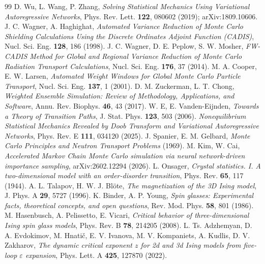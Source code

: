 \documentclass[11pt,a4paper]{article}
\begin{document}
\begin{thebibliography}{99}
 D. Wu, L. Wang, P. Zhang, \emph{Solving Statistical Mechanics Using Variational
Autoregressive Networks}, Phys. Rev. Lett. \textbf{122}, 080602 (2019); arXiv:1809.10606.
 J. C. Wagner, A. Haghighat, \emph{Automated Variance Reduction of Monte
Carlo Shielding Calculations Using the Discrete Ordinates Adjoint Function (CADIS)},
Nucl. Sci. Eng. \textbf{128}, 186 (1998).
 J. C. Wagner, D. E. Peplow, S. W. Mosher, \emph{FW-CADIS Method for Global
and Regional Variance Reduction of Monte Carlo Radiation Transport Calculations},
Nucl. Sci. Eng. \textbf{176}, 37 (2014).
 M. A. Cooper, E. W. Larsen, \emph{Automated Weight Windows for Global Monte
Carlo Particle Transport}, Nucl. Sci. Eng. \textbf{137}, 1 (2001).
 D. M. Zuckerman, L. T. Chong, \emph{Weighted Ensemble Simulation: Review
of Methodology, Applications, and Software}, Annu. Rev. Biophys. \textbf{46}, 43 (2017).
 W. E, E. Vanden-Eijnden, \emph{Towards a Theory of Transition Paths},
J. Stat. Phys. \textbf{123}, 503 (2006).
 \emph{Nonequilibrium Statistical Mechanics Revealed by Doob Transform and
Variational Autoregressive Networks}, Phys. Rev. E \textbf{111}, 034120 (2025).
 J. Spanier, E. M. Gelbard, \emph{Monte Carlo Principles and Neutron Transport
Problems} (1969).
 M. Kim, W. Cai, \emph{Accelerated Markov Chain Monte Carlo simulation via neural
network-driven importance sampling}, arXiv:2602.12294 (2026).
 L. Onsager, \emph{Crystal statistics. I. A two-dimensional model with an
order-disorder transition}, Phys. Rev. \textbf{65}, 117 (1944).
 A. L. Talapov, H. W. J. Bl\"ote, \emph{The magnetization of the 3D Ising
model}, J. Phys. A \textbf{29}, 5727 (1996).
 K. Binder, A. P. Young, \emph{Spin glasses: Experimental facts,
theoretical concepts, and open questions}, Rev. Mod. Phys. \textbf{58}, 801 (1986).
 M. Hasenbusch, A. Pelissetto, E. Vicari, \emph{Critical behavior of
three-dimensional Ising spin glass models}, Phys. Rev. B \textbf{78}, 214205 (2008).
 L. Ts. Adzhemyan, D. A. Evdokimov, M. Hnati\v{c}, E. V. Ivanova,
M. V. Kompaniets, A. Kudlis, D. V. Zakharov, \emph{The dynamic critical exponent $z$ for 2d and
3d Ising models from five-loop $\varepsilon$ expansion}, Phys. Lett. A \textbf{425}, 127870
(2022).
\end{thebibliography}
\end{document}
